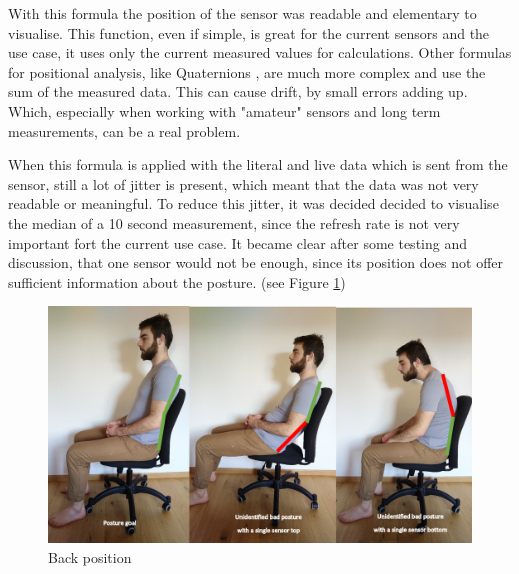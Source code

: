 With this formula the position of the sensor was readable and elementary to visualise. This function, even if simple, is great for the current sensors and the use case, it uses only the current measured values for calculations. Other formulas for positional analysis, like Quaternions \cite{MathsQua11}, are much more complex and use the sum of the measured data. This can cause drift, by small errors adding up. Which, especially when working with "amateur" sensors and long term measurements, can be a real problem.

When this formula is applied with the literal and live data which is sent from the sensor, still a lot of jitter is present, which meant that the data was not very readable or meaningful. To reduce this jitter, it was decided decided to visualise the median of a 10 second measurement, since the refresh rate is not very important fort the current use case. It became clear after some testing and discussion, that one sensor would not be enough, since its position does not offer sufficient information about the posture. (see Figure \ref{fig:BackPos})

\begin{figure}[h]
  \begin{center}
\includegraphics[width=\textwidth]{images/Backposition.png}
  \end{center}
  \caption{Back position}
  \label{fig:BackPos}
\end{figure}

